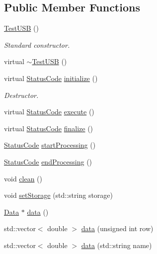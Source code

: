 \subsection*{Public Member Functions}
\begin{DoxyCompactItemize}
\item 
\hyperlink{classTestUSB_a4aae5a332f7484f9ef05296b638975c1}{TestUSB} ()
\begin{DoxyCompactList}\small\item\em Standard constructor. \item\end{DoxyCompactList}\item 
virtual \hyperlink{classTestUSB_aaf3f78695bc950b0bd49c2d60494cd44}{$\sim$TestUSB} ()
\item 
virtual \hyperlink{classStatusCode}{StatusCode} \hyperlink{classTestUSB_ae7cca13f49e4180c93f9f5a3cbd05985}{initialize} ()
\begin{DoxyCompactList}\small\item\em Destructor. \item\end{DoxyCompactList}\item 
virtual \hyperlink{classStatusCode}{StatusCode} \hyperlink{classTestUSB_a8c3d68e00ec4f10ec638969756a925a8}{execute} ()
\item 
virtual \hyperlink{classStatusCode}{StatusCode} \hyperlink{classTestUSB_a24bb22d7203746e6c3b5669aa71e72f3}{finalize} ()
\item 
\hyperlink{classStatusCode}{StatusCode} \hyperlink{classProcessus_a09319bde9bed93e290f69b4e04585543}{startProcessing} ()
\item 
\hyperlink{classStatusCode}{StatusCode} \hyperlink{classProcessus_a5e4da662989d356b89d490b89c7afbfd}{endProcessing} ()
\item 
void \hyperlink{classProcessus_aaeb17673b98d2b39f3aa780e335e0968}{clean} ()
\item 
void \hyperlink{classProcessus_ad57a29b33f9021eda9f6929136f1784f}{setStorage} (std::string storage)
\item 
\hyperlink{classData}{Data} $\ast$ \hyperlink{classProcessus_a16e45f329fbce935aeef0ff3cb508228}{data} ()
\item 
std::vector$<$ double $>$ \hyperlink{classProcessus_aa7c57483cf4b9ab0b2d0ae2de8316402}{data} (unsigned int row)
\item 
std::vector$<$ double $>$ \hyperlink{classProcessus_abf4d91fb36707e1d50178bab12d21ae9}{data} (std::string name)
\item 

\end{DoxyCompactItemize}
